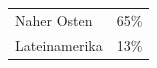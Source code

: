 \documentclass[a4paper,12pt,abstracton,titlepage]{scrartcl}
\begin{document}
\begin{tabular}[t]{lr}
Naher Osten & 65\%\\
Lateinamerika & 13\%\\
\end{tabular}\\


\end{document}
